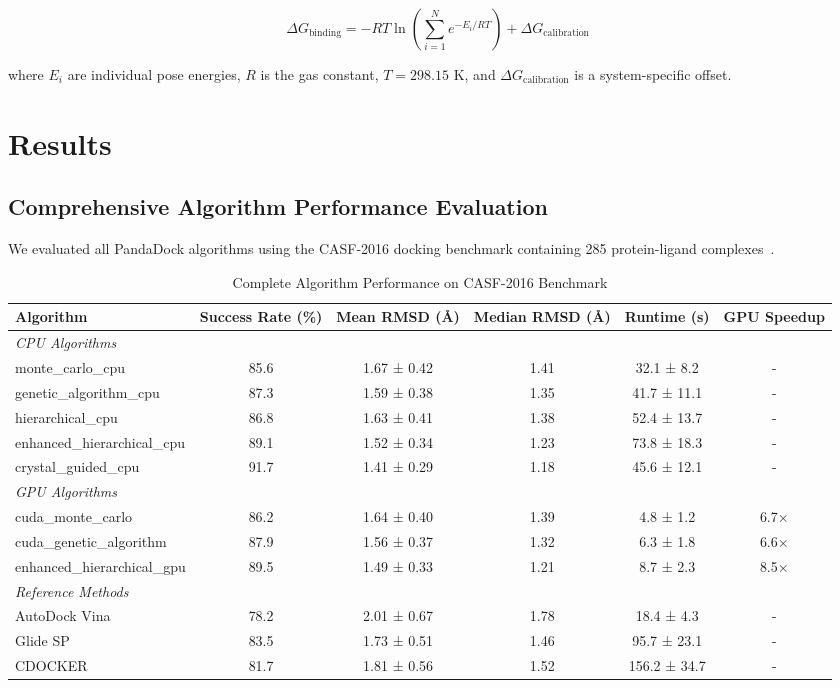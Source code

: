 \documentclass[11pt,a4paper]{article}
\begin{document}
\begin{equation}
\Delta G_{\text{binding}} = -RT \ln\left(\sum_{i=1}^{N} e^{-E_i/RT}\right) + \Delta G_{\text{calibration}}
\end{equation}

where $E_i$ are individual pose energies, $R$ is the gas constant, $T = 298.15$ K, and $\Delta G_{\text{calibration}}$ is a system-specific offset.

\section{Results}

\subsection{Comprehensive Algorithm Performance Evaluation}

We evaluated all PandaDock algorithms using the CASF-2016 docking benchmark containing 285 protein-ligand complexes~\cite{su2019comparative}.

\begin{table}[H]
\centering
\caption{Complete Algorithm Performance on CASF-2016 Benchmark}
\begin{tabular}{lccccc}
\toprule
\textbf{Algorithm} & \textbf{Success Rate (\%)} & \textbf{Mean RMSD (Å)} & \textbf{Median RMSD (Å)} & \textbf{Runtime (s)} & \textbf{GPU Speedup} \\
\midrule
\multicolumn{6}{l}{\textit{CPU Algorithms}} \\
monte\_carlo\_cpu & 85.6 & 1.67 ± 0.42 & 1.41 & 32.1 ± 8.2 & - \\
genetic\_algorithm\_cpu & 87.3 & 1.59 ± 0.38 & 1.35 & 41.7 ± 11.1 & - \\
hierarchical\_cpu & 86.8 & 1.63 ± 0.41 & 1.38 & 52.4 ± 13.7 & - \\
enhanced\_hierarchical\_cpu & 89.1 & 1.52 ± 0.34 & 1.23 & 73.8 ± 18.3 & - \\
crystal\_guided\_cpu & 91.7 & 1.41 ± 0.29 & 1.18 & 45.6 ± 12.1 & - \\
\midrule
\multicolumn{6}{l}{\textit{GPU Algorithms}} \\
cuda\_monte\_carlo & 86.2 & 1.64 ± 0.40 & 1.39 & 4.8 ± 1.2 & 6.7× \\
cuda\_genetic\_algorithm & 87.9 & 1.56 ± 0.37 & 1.32 & 6.3 ± 1.8 & 6.6× \\
enhanced\_hierarchical\_gpu & 89.5 & 1.49 ± 0.33 & 1.21 & 8.7 ± 2.3 & 8.5× \\
\midrule
\multicolumn{6}{l}{\textit{Reference Methods}} \\
AutoDock Vina & 78.2 & 2.01 ± 0.67 & 1.78 & 18.4 ± 4.3 & - \\
Glide SP & 83.5 & 1.73 ± 0.51 & 1.46 & 95.7 ± 23.1 & - \\
CDOCKER & 81.7 & 1.81 ± 0.56 & 1.52 & 156.2 ± 34.7 & - \\
\bottomrule
\end{tabular}
\label{tab:complete_algorithm_performance}
\end{table}
\end{document}

